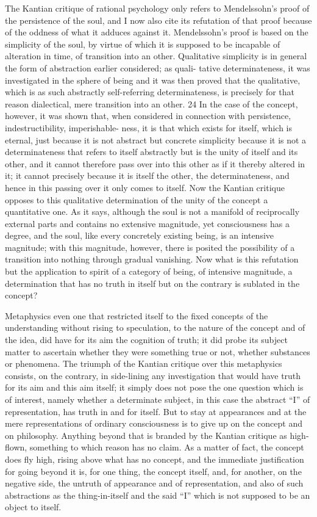 The Kantian critique of rational psychology only refers to Mendelssohn's
proof of the persistence of the soul, and I now also cite its refutation of that
proof because of the oddness of what it adduces against it. Mendelssohn's
proof is based on the simplicity of the soul, by virtue of which it is supposed
to be incapable of alteration in time, of transition into an other. Qualitative
simplicity is in general the form of abstraction earlier considered; as quali-
tative determinateness, it was investigated in the sphere of being and it was
then proved that the qualitative, which is as such abstractly self-referring
determinateness, is precisely for that reason dialectical, mere transition into
an other. 24 In the case of the concept, however, it was shown that, when
considered in connection with persistence, indestructibility, imperishable-
ness, it is that which exists for itself, which is eternal, just because it is not
abstract but concrete simplicity
 because it is not a determinateness that
refers to itself abstractly but is the unity of itself and its other, and it cannot
therefore pass over into this other as if it thereby altered in it; it cannot
precisely because it is itself the other, the determinateness, and hence in this
passing over it only comes to itself.
 Now the Kantian critique opposes
to this qualitative determination of the unity of the concept a quantitative
one. As it says, although the soul is not a manifold of reciprocally external
parts and contains no extensive magnitude, yet consciousness has a degree,
and the soul, like every concretely existing being, is an intensive magnitude;
with this magnitude, however, there is posited the possibility of a transition
into nothing through gradual vanishing.
 Now what is this refutation
but the application to spirit of a category of being, of intensive magnitude,
a determination that has no truth in itself but on the contrary is sublated
in the concept?

Metaphysics even one that restricted itself
to the fixed concepts of the understanding
without rising to speculation,
to the nature of the concept and of the idea,
did have for its aim the cognition of truth;
it did probe its subject matter to ascertain
whether they were something true or not,
whether substances or phenomena.
The triumph of the Kantian critique
over this metaphysics consists, on the contrary,
in side-lining any investigation
that would have truth for its aim and this aim itself;
it simply does not pose the one question
which is of interest,
namely whether a determinate subject,
in this case the abstract “I” of representation,
has truth in and for itself.
But to stay at appearances and at the mere representations
of ordinary consciousness is to give up
on the concept and on philosophy.
Anything beyond that is branded
by the Kantian critique as high-flown,
something to which reason has no claim.
As a matter of fact, the concept does fly high,
rising above what has no concept,
and the immediate justification
for going beyond it is, for one thing, the concept itself,
and, for another, on the negative side,
the untruth of appearance and of representation,
and also of such abstractions as the thing-in-itself
and the said “I” which is not supposed to be an object to itself.

